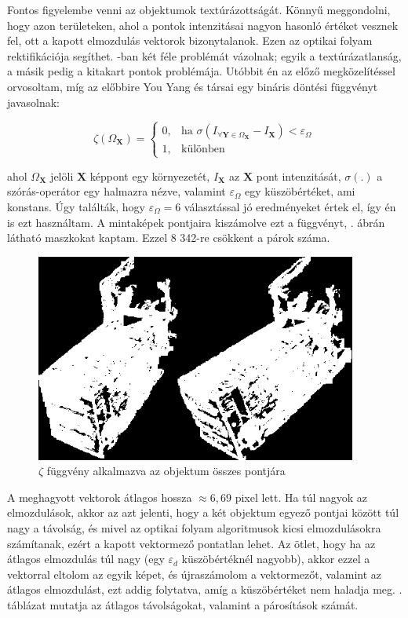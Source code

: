 Fontos figyelembe venni az objektumok textúrázottságát. Könnyű meggondolni, hogy azon területeken, ahol a pontok intenzitásai nagyon hasonló értéket vesznek fel, ott a kapott elmozdulás vektorok bizonytalanok. Ezen az optikai folyam rektifikációja segíthet. \cite{optical-flow-rectification}-ban két féle problémát vázolnak; egyik a textúrázatlanság, a másik pedig a kitakart pontok problémája. {\color{red} Utóbbit én az előző megközelítéssel orvosoltam}, míg az előbbire You Yang és társai egy bináris döntési függvényt javasolnak:

\[
    \zeta(\Omega_\mathbf{X})= 
\begin{cases}
    0,              & \text{ha } \sigma(I_{\forall \mathbf{Y}\in\Omega_\mathbf{X}} - I_\mathbf{X}) < \varepsilon_\Omega\\
    1,              & \text{különben}
\end{cases}
\]

ahol $\Omega_\mathbf{X}$ jelöli $\mathbf{X}$ képpont egy környezetét, $I_\mathbf{X}$ az $\mathbf{X}$ pont intenzitását, $\sigma(.)$ a szórás-operátor egy halmazra nézve, valamint $\varepsilon_\Omega$ egy küszöbértéket, ami konstans. Úgy találták, hogy $\varepsilon_\Omega = 6$ választással jó eredményeket értek el, így én is ezt használtam. A mintaképek pontjaira kiszámolve ezt a függvényt, . ábrán látható maszkokat kaptam. Ezzel 8 342-re csökkent a párok száma.

\begin{figure}[tbh]
\centering
\includegraphics[width=300pt]{figures/textures.png}
\caption{$\zeta$ függvény alkalmazva az objektum összes pontjára \label{fig:textures}}
\end{figure}

A meghagyott vektorok átlagos hossza $\approx 6,69$ pixel lett. Ha túl nagyok az elmozdulások, akkor az azt jelenti, hogy a két objektum egyező pontjai között túl nagy a távolság, és mivel az optikai folyam algoritmusok kicsi elmozdulásokra számítanak, ezért a kapott vektormező pontatlan lehet. Az ötlet, hogy ha az átlagos elmozdulás túl nagy (egy $\varepsilon_d$ küszöbértéknél nagyobb), akkor ezzel a vektorral eltolom az egyik képet, és újraszámolom a vektormezőt, valamint az átlagos elmozdulást, ezt addig folytatva, amíg a küszöbértéket nem haladja meg. . táblázat mutatja az átlagos távolságokat, valamint a párosítások számát.

